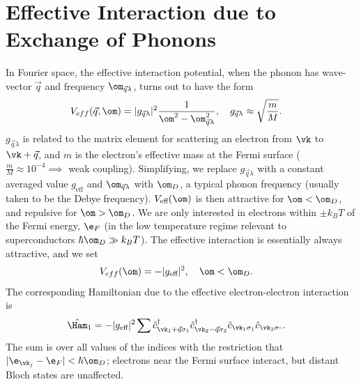 \documentclass[a4paper, 11pt, normalem]{report}
\begin{document}
\section{Effective Interaction due to Exchange of Phonons}
In Fourier space, the effective interaction potential, when the phonon has wave-vector $\vec{q}$ and frequency $\om_{\vec{q}\lambda}$, turns out to have the form
\begin{align}
    V_{eff}(\vec{q},\om) &= |g_{\vec{q}\lambda}|^2\frac{1}{\om^2-\om_{\vec{q}\lambda}^2},\quad g_{\vec{q}\lambda} \approx \sqrt{\frac{m}{M}}.
\end{align}
$g_{\vec{q}\lambda}$ is related to the matrix element for scattering an electron from $\vk$ to $\vk+\vec{q}$, and $m$ is the electron's effective mass at the Fermi surface ($\frac{m}{M}\approx10^{-4}\implies$ weak coupling).
Simplifying, we replace $g_{\vec{q}\lambda}$ with a constant averaged value $g_{\text{eff}}$ and $\om_{\vec{q}\lambda}$ with $\om_D$, a typical phonon frequency (usually taken to be the Debye frequency).
$V_{\text{eff}}(\om)$ is then attractive for $\om<\om_D$, and repulsive for $\om>\om_D$.
We are only interested in electrons within $\pm k_BT$ of the Fermi energy, $\e_F$ (in the low temperature regime relevant to superconductors $\hbar\om_D\gg k_BT$).
The effective interaction is essentially always attractive, and we set
\begin{align}
    V_{eff}(\om) &= -|g_{\text{eff}}|^2,\quad \om<\om_D.
\end{align}
The corresponding Hamiltonian due to the effective electron-electron interaction is
\begin{align}
    \hat{\Ham}_1 &= -|g_{\text{eff}}|^2 \sum \hat{c}^\dagger_{\vk_1+\vec{q}\sigma_1}\hat{c}^\dagger_{\vk_2-\vec{q}\sigma_2}\hat{c}_{\vk_1\sigma_1}\hat{c}_{\vk_2\sigma_"}.
\end{align}
The sum is over all values of the indices with the restriction that $|\e_{\vk_j}-\e_F|<\hbar\om_D$; electrons near the Fermi surface interact, but distant Bloch states are unaffected.
\end{document}
